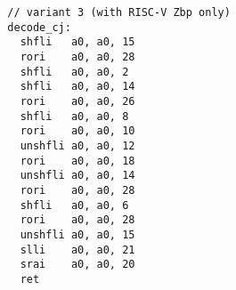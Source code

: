 \begin{multicols}{2}
\begin{minipage}{\linewidth}
\begin{verbatim}
  // variant 3 (with RISC-V Zbp only)
  decode_cj:
    shfli   a0, a0, 15
    rori    a0, a0, 28
    shfli   a0, a0, 2
    shfli   a0, a0, 14
    rori    a0, a0, 26
    shfli   a0, a0, 8
    rori    a0, a0, 10
    unshfli a0, a0, 12
    rori    a0, a0, 18
    unshfli a0, a0, 14
    rori    a0, a0, 28
    shfli   a0, a0, 6
    rori    a0, a0, 28
    unshfli a0, a0, 15
    slli    a0, a0, 21
    srai    a0, a0, 20
    ret
\end{verbatim}
\end{minipage}

\end{multicols}
